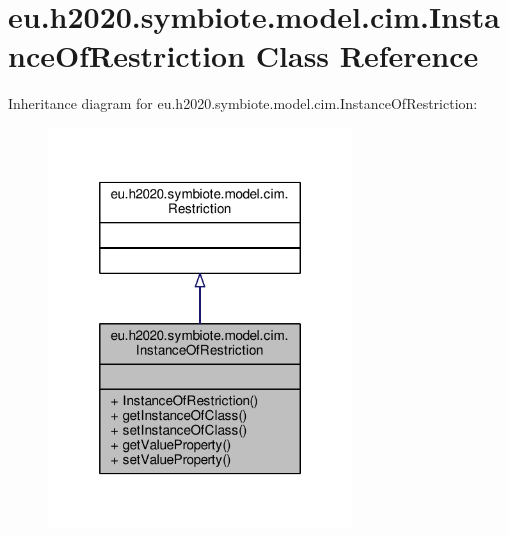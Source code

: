 \hypertarget{classeu_1_1h2020_1_1symbiote_1_1model_1_1cim_1_1InstanceOfRestriction}{}\section{eu.\+h2020.\+symbiote.\+model.\+cim.\+Instance\+Of\+Restriction Class Reference}
\label{classeu_1_1h2020_1_1symbiote_1_1model_1_1cim_1_1InstanceOfRestriction}


Inheritance diagram for eu.\+h2020.\+symbiote.\+model.\+cim.\+Instance\+Of\+Restriction\+:\nopagebreak
\begin{figure}[H]
\begin{center}
\leavevmode
\includegraphics[width=228pt]{classeu_1_1h2020_1_1symbiote_1_1model_1_1cim_1_1InstanceOfRestriction__inherit__graph}
\end{center}
\end{figure}



